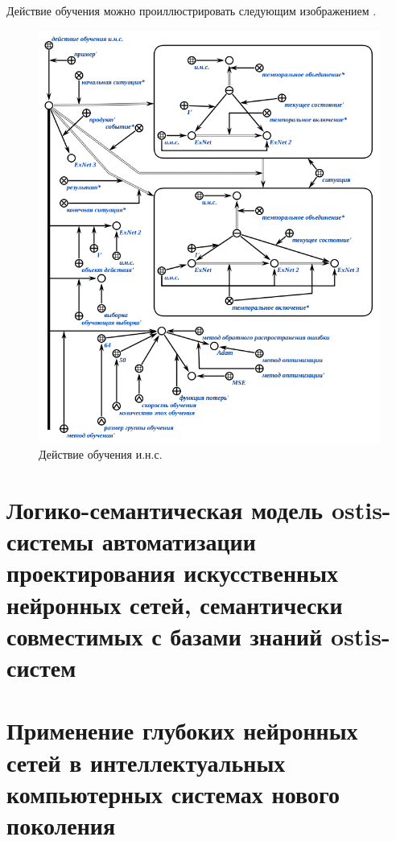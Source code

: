 Действие обучения  можно проиллюстрировать следующим изображением \textit{}.

\begin{figure}[H]
	\includegraphics[scale=0.8]{author/part3/figures/ann_training_nn_scg.png}
	\caption{Действие обучения и.н.с.}
	\label{fig:ann_training_nn_scg}
\end{figure}

\section{Логико-семантическая модель ostis-системы автоматизации проектирования искусственных нейронных сетей, семантически совместимых с базами знаний ostis-систем}
\section{Применение глубоких нейронных сетей в интеллектуальных компьютерных системах нового поколения}

